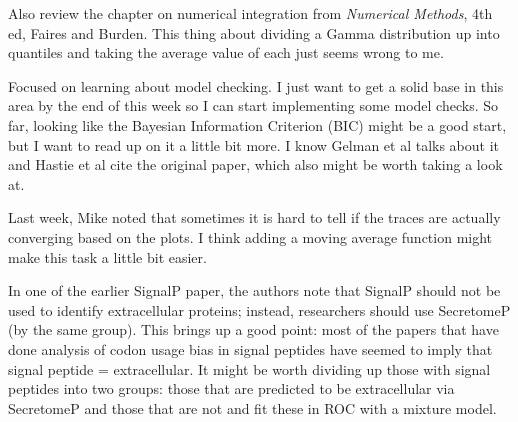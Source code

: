 \documentclass[11pt]{labbook}
\begin{document}
Also review the chapter on numerical integration from \textit{Numerical Methods}, 4th ed, Faires and Burden. This thing about dividing a Gamma distribution up into quantiles and taking the average value of each just seems wrong to me. 

Focused on learning about model checking. I just want to get a solid base in this area by the end of this week so I can start implementing some model checks. So far, looking like the Bayesian Information Criterion (BIC) might be a good start, but I want to read up on it a little bit more. I know Gelman et al talks about it and Hastie et al cite the original paper, which also might be worth taking a look at. 

Last week, Mike noted that sometimes it is hard to tell if the traces are actually converging based on the plots. I think adding a moving average function might make this task a little bit easier. 

In one of the earlier SignalP paper, the authors note that SignalP should not be used to identify extracellular proteins; instead, researchers should use SecretomeP (by the same group). This brings up a good point: most of the papers that have done analysis of codon usage bias in signal peptides have seemed to imply that signal peptide = extracellular. It might be worth dividing up those with signal peptides into two groups: those that are predicted to be extracellular via SecretomeP and those that are not and fit these in ROC with a mixture model. 
\end{document}
